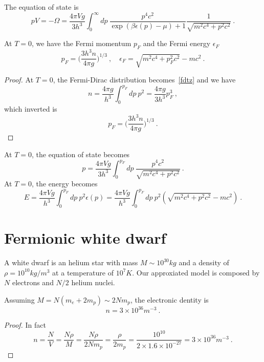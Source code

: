     The equation of state is 
    \begin{equation}
        pV = - \Omega = \frac{4 \pi V g}{3 h^3} \int_0^\infty dp ~ \frac{p^4 c^2}{\exp(\beta \epsilon(p) - \mu) + 1} \frac{1}{\sqrt{m^2 c^4 + p^2 c^2}} ~.
    \end{equation}

    At $T=0$, we have the Fermi momentum $p_F$ and the Fermi energy $\epsilon_F$
    \begin{equation}
        p_F = \Big ( \frac{3 h^3 n}{4 \pi g} \Big)^{1/3} ~, \quad \epsilon_F = \sqrt{m^2 c^4 + p_F^2 c^2} - mc^2 ~.
    \end{equation}
    \begin{proof}
        At $T=0$, the Fermi-Dirac distribution becomes~\eqref{fdtz} and we have
        \begin{equation}
            n = \frac{4 \pi g}{h^3} \int_0^{p_F} dp ~ p^2 = \frac{4 \pi g}{3 h^3} p_F^3 ~,
        \end{equation}
        which inverted is 
        \begin{equation}
            p_F = \Big ( \frac{3 h^3 n}{4 \pi g} \Big)^{1/3} ~.
        \end{equation}
    \end{proof}

    At $T=0$, the equation of state becomes
    \begin{equation}
        p = \frac{4 \pi V g}{3 h^3} \int_0^{p_F} dp ~ \frac{p^4 c^2}{\sqrt{m^2 c^4 + p^2 c^2}}  ~.
    \end{equation}
    At $T=0$, the energy becomes
    \begin{equation}
        E = \frac{4 \pi V g}{h^3} \int_0^{p_F} dp ~ p^2 \epsilon(p) = \frac{4 \pi V g}{h^3} \int_0^{p_F} dp ~ p^2 (\sqrt{m^2 c^4 + p^2 c^2} - mc^2 ) ~.
    \end{equation}

\section{Fermionic white dwarf}

    A white dwarf is an helium star with mass $M \sim 10^{30} kg$ and a density of $\rho = 10^{10} kg/m^3$ at a temperature of $10^{7} K$. Our approxiated model is composed by $N$ electrons and $N/2$ helium nuclei.

    Assuming $M = N(m_e + 2 m_p) \sim 2 N m_p$, the electronic dentity is 
    \begin{equation*}
        n = 3 \times 10^{36} m^{-3} ~.
    \end{equation*}
    \begin{proof}
        In fact 
        \begin{equation*}
            n = \frac{N}{V} = \frac{N \rho}{M} = \frac{N \rho}{2 N m_p} = \frac{\rho}{2 m_p} = \frac{10^{10}}{2 \times 1.6 \times 10^{-27}} = 3 \times 10^{36} m^{-3} ~.
        \end{equation*}
    \end{proof}

